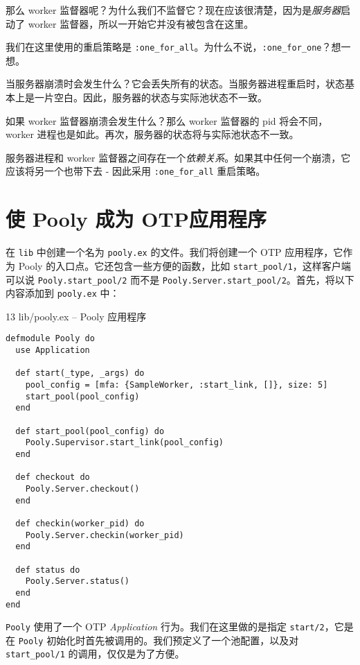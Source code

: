那么 worker
监督器呢？为什么我们不监督它？现在应该很清楚，因为是\emph{服务器}启动了
worker 监督器，所以一开始它并没有被包含在这里。

我们在这里使用的重启策略是
\texttt{:one\_for\_all}。为什么不说，\texttt{:one\_for\_one}？想一想。

当服务器崩溃时会发生什么？它会丢失所有的状态。当服务器进程重启时，状态基本上是一片空白。因此，服务器的状态与实际池状态不一致。

如果 worker 监督器崩溃会发生什么？那么 worker 监督器的 pid
将会不同，worker 进程也是如此。再次，服务器的状态将与实际池状态不一致。

服务器进程和 worker
监督器之间存在一个\emph{依赖关系}。如果其中任何一个崩溃，它应该将另一个也带下去
- 因此采用 \texttt{:one\_for\_all} 重启策略。

 \section{使 Pooly 成为 OTP应用程序}

在 \texttt{lib} 中创建一个名为
\texttt{pooly.ex} 的文件。我们将创建一个 OTP
应用程序，它作为 Pooly 的入口点。它还包含一些方便的函数，比如
\texttt{start\_pool/1}，这样客户端可以说
\texttt{Pooly.start\_pool/2} 而不是
\texttt{Pooly.Server.start\_pool/2}。首先，将以下内容添加到
\texttt{pooly.ex} 中：

\begin{code}{13 lib/pooly.ex -- Pooly 应用程序}

\begin{verbatim}
defmodule Pooly do
  use Application

  def start(_type, _args) do
    pool_config = [mfa: {SampleWorker, :start_link, []}, size: 5]
    start_pool(pool_config)
  end

  def start_pool(pool_config) do
    Pooly.Supervisor.start_link(pool_config)
  end

  def checkout do
    Pooly.Server.checkout()
  end

  def checkin(worker_pid) do
    Pooly.Server.checkin(worker_pid)
  end

  def status do
    Pooly.Server.status()
  end
end
\end{verbatim}
\end{code}

\texttt{Pooly} 使用了一个 OTP \emph{Application}
行为。我们在这里做的是指定 \texttt{start/2}，它是在
\texttt{Pooly}
初始化时首先被调用的。我们预定义了一个池配置，以及对
\texttt{start\_pool/1} 的调用，仅仅是为了方便。

